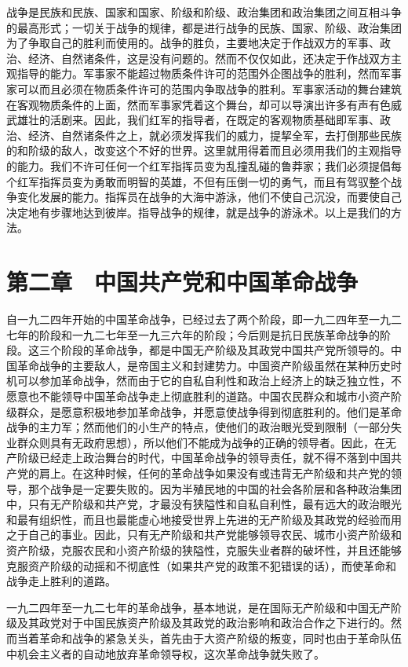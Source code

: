 战争是民族和民族、国家和国家、阶级和阶级、政治集团和政治集团之间互相斗争的最高形式；一切关于战争的规律，都是进行战争的民族、国家、阶级、政治集团为了争取自己的胜利而使用的。战争的胜负，主要地决定于作战双方的军事、政治、经济、自然诸条件，这是没有问题的。然而不仅仅如此，还决定于作战双方主观指导的能力。军事家不能超过物质条件许可的范围外企图战争的胜利，然而军事家可以而且必须在物质条件许可的范围内争取战争的胜利。军事家活动的舞台建筑在客观物质条件的上面，然而军事家凭着这个舞台，却可以导演出许多有声有色威武雄壮的活剧来。因此，我们红军的指导者，在既定的客观物质基础即军事、政治、经济、自然诸条件之上，就必须发挥我们的威力，提挈全军，去打倒那些民族的和阶级的敌人，改变这个不好的世界。这里就用得着而且必须用我们的主观指导的能力。我们不许可任何一个红军指挥员变为乱撞乱碰的鲁莽家；我们必须提倡每个红军指挥员变为勇敢而明智的英雄，不但有压倒一切的勇气，而且有驾驭整个战争变化发展的能力。指挥员在战争的大海中游泳，他们不使自己沉没，而要使自己决定地有步骤地达到彼岸。指导战争的规律，就是战争的游泳术。以上是我们的方法。

\section{第二章　中国共产党和中国革命战争}

自一九二四年开始的中国革命战争，已经过去了两个阶段，即一九二四年至一九二七年的阶段和一九二七年至一九三六年的阶段；今后则是抗日民族革命战争的阶段。这三个阶段的革命战争，都是中国无产阶级及其政党中国共产党所领导的。中国革命战争的主要敌人，是帝国主义和封建势力。中国资产阶级虽然在某种历史时机可以参加革命战争，然而由于它的自私自利性和政治上经济上的缺乏独立性，不愿意也不能领导中国革命战争走上彻底胜利的道路。中国农民群众和城市小资产阶级群众，是愿意积极地参加革命战争，并愿意使战争得到彻底胜利的。他们是革命战争的主力军；然而他们的小生产的特点，使他们的政治眼光受到限制（一部分失业群众则具有无政府思想），所以他们不能成为战争的正确的领导者。因此，在无产阶级已经走上政治舞台的时代，中国革命战争的领导责任，就不得不落到中国共产党的肩上。在这种时候，任何的革命战争如果没有或违背无产阶级和共产党的领导，那个战争是一定要失败的。因为半殖民地的中国的社会各阶层和各种政治集团中，只有无产阶级和共产党，才最没有狭隘性和自私自利性，最有远大的政治眼光和最有组织性，而且也最能虚心地接受世界上先进的无产阶级及其政党的经验而用之于自己的事业。因此，只有无产阶级和共产党能够领导农民、城市小资产阶级和资产阶级，克服农民和小资产阶级的狭隘性，克服失业者群的破坏性，并且还能够克服资产阶级的动摇和不彻底性（如果共产党的政策不犯错误的话），而使革命和战争走上胜利的道路。

一九二四年至一九二七年的革命战争，基本地说，是在国际无产阶级和中国无产阶级及其政党对于中国民族资产阶级及其政党的政治影响和政治合作之下进行的。然而当着革命和战争的紧急关头，首先由于大资产阶级的叛变，同时也由于革命队伍中机会主义者的自动地放弃革命领导权，这次革命战争就失败了。

